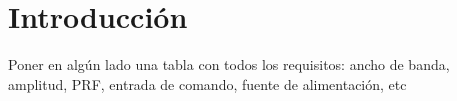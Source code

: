 \chapter{Introducción}

Poner en algún lado una tabla con todos los requisitos: ancho de banda, amplitud, PRF, entrada de comando, fuente de alimentación, etc
